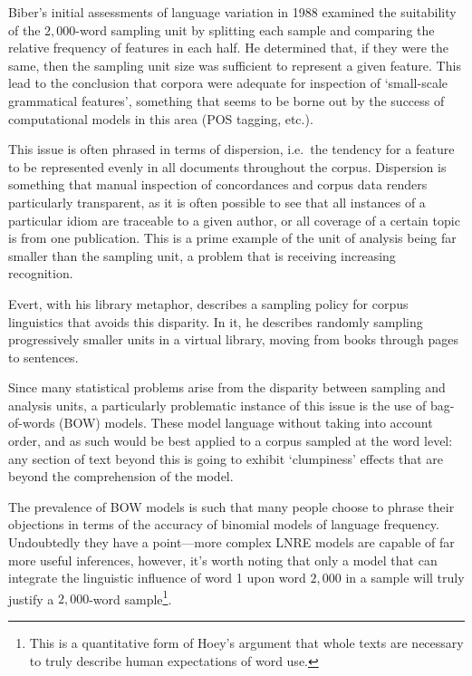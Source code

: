 Biber's initial assessments of language variation in 1988\cite{biber1988variation} examined the suitability of the $2,000$-word sampling unit by splitting each sample and comparing the relative frequency of features in each half.  He determined that, if they were the same, then the sampling unit size was sufficient to represent a given feature.  This lead to the conclusion that corpora were adequate for inspection of `small-scale grammatical features', something that seems to be borne out by the success of computational models in this area (POS tagging, etc.).

This issue is often phrased in terms of dispersion\cite{kilgarriff2005language,sparkjones1972tfidf}, i.e.\ the tendency for a feature to be represented evenly in all documents throughout the corpus.  Dispersion is something that manual inspection of concordances and corpus data renders particularly transparent, as it is often possible to see that all instances of a particular idiom are traceable to a given author, or all coverage of a certain topic is from one publication.  This is a prime example of the unit of analysis being far smaller than the sampling unit, a problem that is receiving increasing recognition.

Evert, with his library metaphor\cite{evert2006random}, describes a sampling policy for corpus linguistics that avoids this disparity.  In it, he describes randomly sampling progressively smaller units in a virtual library, moving from books through pages to sentences.%

Since many statistical problems arise from the disparity between sampling and analysis units, a particularly problematic instance of this issue is the use of bag-of-words (BOW) models.  These model language without taking into account order, and as such would be best applied to a corpus sampled at the word level: any section of text beyond this is going to exhibit `clumpiness' effects that are beyond the comprehension of the model.

The prevalence of BOW models is such that many people choose to phrase their objections in terms of the accuracy of binomial models of language frequency\cite{kilgarriff2005language,evert2004simple,evert2007zipfr}.  Undoubtedly they have a point---more complex LNRE models are capable of far more useful inferences, however, it's worth noting that only a model that can integrate the linguistic influence of word 1 upon word $2,000$ in a sample will truly justify a $2,000$-word sample\footnote{This is a quantitative form of Hoey's argument that whole texts are necessary to truly describe human expectations of word use\cite{hoey2005lexical}.}.

